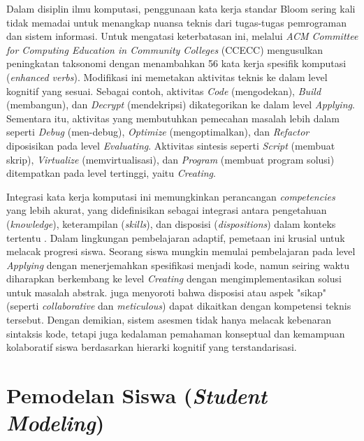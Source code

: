 Dalam disiplin ilmu komputasi, penggunaan kata kerja standar Bloom sering kali tidak memadai untuk menangkap nuansa teknis dari tugas-tugas pemrograman dan sistem informasi. Untuk mengatasi keterbatasan ini, \textcite{ACM2023} melalui \textit{ACM Committee for Computing Education in Community Colleges} (CCECC) mengusulkan peningkatan taksonomi dengan menambahkan 56 kata kerja spesifik komputasi (\textit{enhanced verbs}). Modifikasi ini memetakan aktivitas teknis ke dalam level kognitif yang sesuai. Sebagai contoh, aktivitas \textit{Code} (mengodekan), \textit{Build} (membangun), dan \textit{Decrypt} (mendekripsi) dikategorikan ke dalam level \textit{Applying}. Sementara itu, aktivitas yang membutuhkan pemecahan masalah lebih dalam seperti \textit{Debug} (men-debug), \textit{Optimize} (mengoptimalkan), dan \textit{Refactor} diposisikan pada level \textit{Evaluating}. Aktivitas sintesis seperti \textit{Script} (membuat skrip), \textit{Virtualize} (memvirtualisasi), dan \textit{Program} (membuat program solusi) ditempatkan pada level tertinggi, yaitu \textit{Creating}.

Integrasi kata kerja komputasi ini memungkinkan perancangan \textit{competencies} yang lebih akurat, yang didefinisikan sebagai integrasi antara pengetahuan (\textit{knowledge}), keterampilan (\textit{skills}), dan disposisi (\textit{dispositions}) dalam konteks tertentu \autocite{ACM2023}. Dalam lingkungan pembelajaran adaptif, pemetaan ini krusial untuk melacak progresi siswa. Seorang siswa mungkin memulai pembelajaran pada level \textit{Applying} dengan menerjemahkan spesifikasi menjadi kode, namun seiring waktu diharapkan berkembang ke level \textit{Creating} dengan mengimplementasikan solusi untuk masalah abstrak. \textcite{ACM2023} juga menyoroti bahwa disposisi atau aspek "sikap" (seperti \textit{collaborative} dan \textit{meticulous}) dapat dikaitkan dengan kompetensi teknis tersebut. Dengan demikian, sistem asesmen tidak hanya melacak kebenaran sintaksis kode, tetapi juga kedalaman pemahaman konseptual dan kemampuan kolaboratif siswa berdasarkan hierarki kognitif yang terstandarisasi.


\section{Pemodelan Siswa (\textit{Student Modeling})}
\label{sec:student_modeling}

